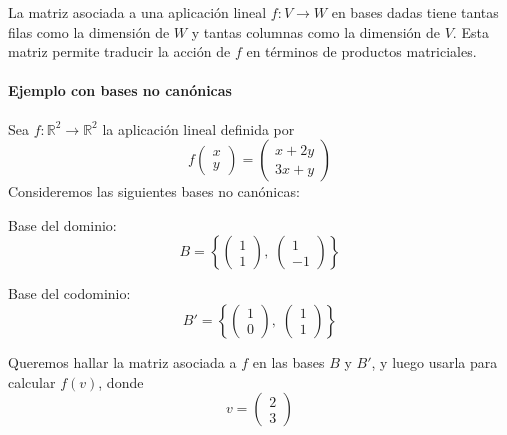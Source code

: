 \begin{tcolorbox}
La matriz asociada a una aplicación lineal \(f: V \to W\) en bases dadas tiene tantas filas como la dimensión de \(W\) y tantas columnas como la dimensión de \(V\). Esta matriz permite traducir la acción de \(f\) en términos de productos matriciales.
\end{tcolorbox}

\paragraph{Ejemplo con bases no canónicas}

\begin{ejemplo}
Sea \(f: \mathbb{R}^2 \to \mathbb{R}^2\) la aplicación lineal definida por
\[
f\begin{pmatrix}x \\ y\end{pmatrix} = \begin{pmatrix}x + 2y \\ 3x + y\end{pmatrix}
\]
Consideremos las siguientes bases no canónicas:

Base del dominio:
\[
B = \left\{ \begin{pmatrix}1 \\ 1\end{pmatrix},\; \begin{pmatrix}1 \\ -1\end{pmatrix} \right\}
\]

Base del codominio:
\[
B' = \left\{ \begin{pmatrix}1 \\ 0\end{pmatrix},\; \begin{pmatrix}1 \\ 1\end{pmatrix} \right\}
\]

Queremos hallar la matriz asociada a \(f\) en las bases \(B\) y \(B'\), y luego usarla para calcular \(f(v)\), donde
\[
v = \begin{pmatrix}2 \\ 3\end{pmatrix}
\]


\end{ejemplo}
